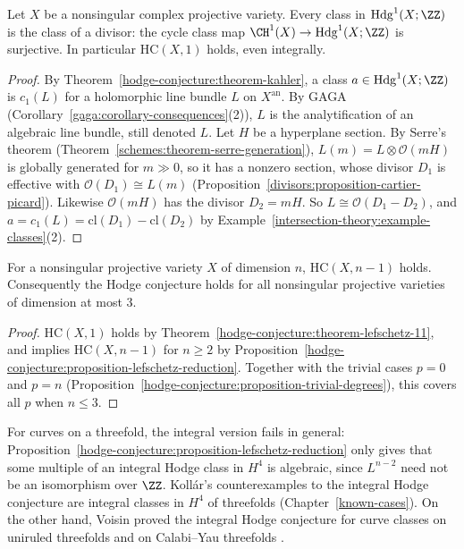 \begin{theorem}[Lefschetz $(1,1)$]\label{hodge-conjecture:theorem-lefschetz-11}
Let $X$ be a nonsingular complex projective variety. Every class in $\mathrm{Hdg}^1(X; \ZZ)$ is the class of a divisor: the cycle class map $\CH^1(X) \to \mathrm{Hdg}^1(X; \ZZ)$ is surjective. In particular
$\mathrm{HC}(X, 1)$ holds, even integrally.
\end{theorem}

\begin{proof}
By Theorem~\ref{hodge-conjecture:theorem-kahler}, a class $a \in \mathrm{Hdg}^1(X; \ZZ)$ is $c_1(L)$ for a holomorphic line bundle $L$ on $X^{\mathrm{an}}$. By GAGA
(Corollary~\ref{gaga:corollary-consequences}(2)), $L$ is the analytification of an algebraic line bundle, still denoted $L$. Let $H$ be a hyperplane section. By Serre's theorem
(Theorem~\ref{schemes:theorem-serre-generation}), $L(m) = L \otimes \mathcal{O}(mH)$ is globally generated for $m \gg 0$, so it has a nonzero section, whose divisor $D_1$ is effective with
$\mathcal{O}(D_1) \cong L(m)$ (Proposition~\ref{divisors:proposition-cartier-picard}). Likewise $\mathcal{O}(mH)$ has the divisor $D_2 = mH$. So $L \cong \mathcal{O}(D_1 - D_2)$, and
$a = c_1(L) = \mathrm{cl}(D_1) - \mathrm{cl}(D_2)$ by Example~\ref{intersection-theory:example-classes}(2).
\end{proof}

\begin{corollary}\label{hodge-conjecture:corollary-codimension-n-1}
For a nonsingular projective variety $X$ of dimension $n$, $\mathrm{HC}(X, n - 1)$ holds. Consequently the Hodge conjecture holds for all nonsingular projective varieties of
dimension at most $3$.
\end{corollary}

\begin{proof}
$\mathrm{HC}(X, 1)$ holds by Theorem~\ref{hodge-conjecture:theorem-lefschetz-11}, and implies $\mathrm{HC}(X, n - 1)$ for $n \geq 2$ by Proposition~\ref{hodge-conjecture:proposition-lefschetz-reduction}.
Together with the trivial cases $p = 0$ and $p = n$ (Proposition~\ref{hodge-conjecture:proposition-trivial-degrees}), this covers all $p$ when $n \leq 3$.
\end{proof}

\begin{remark}\label{hodge-conjecture:remark-integral-curves}
For curves on a threefold, the integral version fails in general: Proposition~\ref{hodge-conjecture:proposition-lefschetz-reduction} only gives that some multiple of an integral Hodge
class in $H^4$ is algebraic, since $L^{n-2}$ need not be an isomorphism over $\ZZ$. Koll\'ar's counterexamples to the integral Hodge conjecture are integral classes in $H^4$ of threefolds
(Chapter~\ref{known-cases}). On the other hand, Voisin proved the integral Hodge conjecture for curve classes on uniruled threefolds and on Calabi--Yau threefolds \cite{voisin-2006}.
\end{remark}

